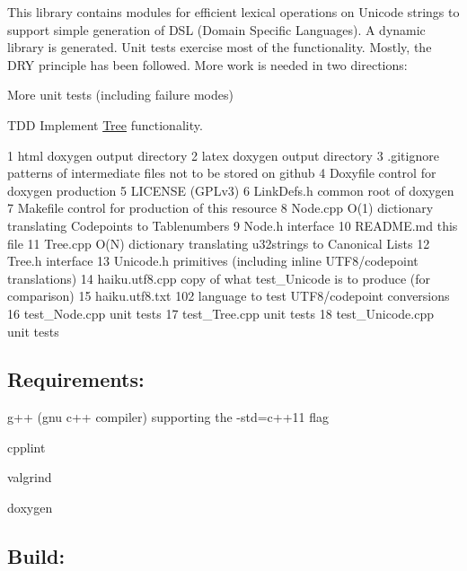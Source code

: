 This library contains modules for efficient lexical operations on Unicode strings to support simple generation of D\+S\+L (Domain Specific Languages). A dynamic library is generated. Unit tests exercise most of the functionality. Mostly, the D\+R\+Y principle has been followed. More work is needed in two directions\+:
\begin{DoxyItemize}
\item More unit tests (including failure modes)
\item T\+D\+D Implement \hyperlink{class_tree}{Tree} functionality.
\end{DoxyItemize}


\begin{DoxyCode}
1 html                doxygen output directory
2 latex               doxygen output directory
3 .gitignore          patterns of intermediate files not to be stored on github
4 Doxyfile            control for doxygen production
5 LICENSE             (GPLv3)
6 LinkDefs.h          common root of doxygen
7 Makefile            control for production of this resource
8 Node.cpp            O(1) dictionary translating Codepoints to Tablenumbers
9 Node.h              interface
10 README.md           this file
11 Tree.cpp            O(N) dictionary translating u32strings to Canonical Lists
12 Tree.h              interface
13 Unicode.h           primitives (including inline UTF8/codepoint translations)
14 haiku.utf8.cpp      copy of what test\_Unicode is to produce (for comparison)
15 haiku.utf8.txt      102 language to test UTF8/codepoint conversions
16 test\_Node.cpp       unit tests
17 test\_Tree.cpp       unit tests
18 test\_Unicode.cpp    unit tests
\end{DoxyCode}


\subsection*{Requirements\+:}


\begin{DoxyItemize}
\item g++ (gnu c++ compiler) supporting the -\/std=c++11 flag
\item cpplint
\item valgrind
\item doxygen
\end{DoxyItemize}

\subsection*{Build\+:}


